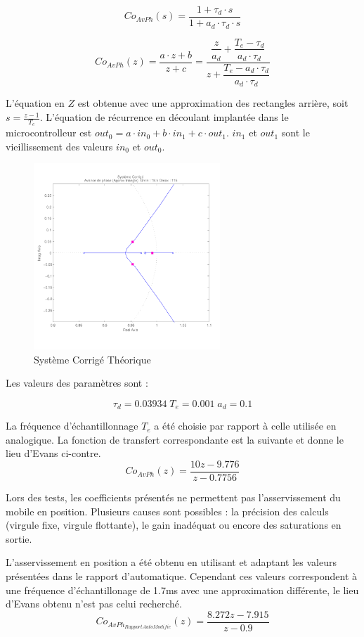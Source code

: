 \documentclass[11pt, french]{article} %
\begin{document}
\[Co_{AvPh}(s)=\dfrac{1+ \tau_d \cdot s}{1 + a_d \cdot \tau_d \cdot s} \]

\[Co_{AvPh}(z)=\dfrac{a \cdot z + b}{z + c}=\dfrac{\dfrac{z}{a_d}+\dfrac{T_e-\tau_d}{a_d \cdot \tau_d} }{z+\dfrac{T_e-a_d \cdot \tau_d}{a_d \cdot \tau_d}}\] 

L'équation en $Z$ est obtenue avec une approximation des rectangles arrière, soit $s=\frac{z-1}{T_e}$. L'équation de récurrence en découlant implantée dans le microcontrolleur est $out_0=a \cdot in_0 + b \cdot in_1 + c \cdot out_1$. 
$in_1$ et $out_1$ sont le vieillissement des valeurs $in_0$ et $out_0$.

\begin{figure}

	\includegraphics[width = 7cm,trim=0 1.4cm 0 0.7cm ,clip=true]
					{SolutionNumerique/SystemeCorrigeThorique.pdf}
	\caption{Système Corrigé Théorique}
	\vspace{1cm}
\end{figure}
Les valeurs des paramètres sont :

\[\tau_d=0.03934 \; T_e=0.001 \; a_d=0.1\]

La fréquence d'échantillonnage $T_e$ a été choisie par rapport à celle utilisée en analogique. La fonction de transfert correspondante est la suivante et donne le lieu d'Evans ci-contre.
\[Co_{AvPh}(z)=\dfrac{10 z - 9.776}{z -0.7756}\]

Lors des tests, les coefficients présentés ne permettent pas l'asservissement du mobile en position. Plusieurs causes sont possibles : la précision des calculs (virgule fixe, virgule flottante), le gain inadéquat ou encore des saturations en sortie.

L'asservissement en position a été obtenu en utilisant et adaptant les valeurs présentées dans le rapport d'automatique. Cependant ces valeurs correspondent à une fréquence d'échantillonage de 1.7ms avec une approximation différente, le lieu d'Evans obtenu n'est pas celui recherché.
\[  Co_{AvPh_{Rapport Auto Modifie}}(z) = \dfrac {8.272z - 7.915} {z - 0.9} \]
\end{document}
